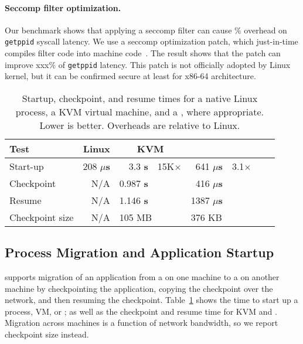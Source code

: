 \paragraph{Seccomp filter optimization.~}
Our benchmark shows that applying a seccomp filter can cause \% overhead on {\tt getppid} syscall latency. We use a seccomp optimization patch, which just-in-time compiles filter code into machine code~\citep{seccomp-jit}.
The result shows that the patch can improve xxx\% of {\tt getppid} latency.
This patch is not officially adopted by Linux kernel, but it can be confirmed secure at least for x86-64 architecture.


\begin{table}[t!b!]
\footnotesize
\centering
\begin{tabular}{|l|r|rr|rr|rr|}
\hline
{\bf Test } & {\bf Linux } & \multicolumn{2}{|c|}{{\bf KVM}}
& \multicolumn{2}{|c|}{{\bf \sysname{}}}\\
\hline

Start-up & 208 {\bf $\mu$s} & 3.3 {\bf s} & 15K$\times$ & 641 {\bf $\mu$s} & 3.1$\times$ \\
\hline
Checkpoint & N/A & 0.987 {\bf s} &  & 416  {\bf $\mu$s} & \\
\hline
Resume & N/A & 1.146 {\bf s}  &  &  1387 {\bf $\mu$s} &  \\
\hline\hline
Checkpoint size & N/A & \multicolumn{2}{|l|}{105 MB} & \multicolumn{2}{|l|}{376 KB}   \\
\hline
\end{tabular}
\caption[Startup, checkpoint, and resume times in Linux, KVM and \sysname{}]
{Startup, checkpoint, and resume times for a native Linux process,
a KVM virtual machine,
and a \sysname{} \picoproc{}, where appropriate. Lower is better.  
Overheads are relative to Linux.} 
\label{tab:graphene:startup}
\end{table}

\subsection{Process Migration and Application Startup}

\sysname{} supports migration of an application from a \picoproc{} on one machine
to a \picoproc{} on another machine by checkpointing the application,
copying the checkpoint over the network, and then resuming the checkpoint.
Table~\ref{tab:graphene:startup} shows the time to start
up a process, VM, or \picoproc{}; as well as the checkpoint and resume time for KVM and \sysname{}.
Migration across machines is a function of network bandwidth,
so we report checkpoint size instead. %


